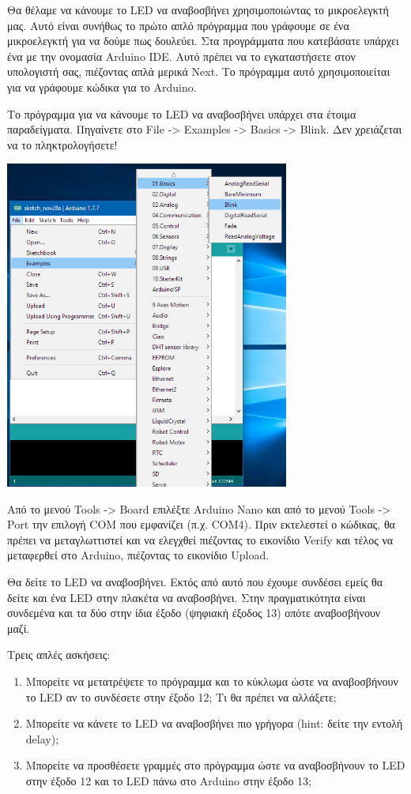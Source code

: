 \documentclass[a4paper,twoside,12pt]{article}
\begin{document}
Θα θέλαμε να κάνουμε το LED να αναβοσβήνει χρησιμοποιώντας το μικροελεγκτή μας. Αυτό είναι συνήθως το πρώτο απλό πρόγραμμα που γράφουμε σε ένα μικροελεγκτή για να δούμε πως δουλεύει. 
Στα προγράμματα που κατεβάσατε υπάρχει ένα με την ονομασία Arduino IDE. Αυτό πρέπει να το εγκαταστήσετε στον υπολογιστή σας, πιέζοντας απλά μερικά Next. Το πρόγραμμα αυτό χρησιμοποιείται για να γράφουμε κώδικα για το Arduino.

Το πρόγραμμα για να κάνουμε το LED να αναβοσβήνει υπάρχει στα έτοιμα παραδείγματα. Πηγαίνετε στο File -> Examples -> Basics -> Blink. Δεν χρειάζεται να το πληκτρολογήσετε!

\begin{center}
  \includegraphics[width=0.7\textwidth]{images/main/blink-program}
\end{center}

Από το μενού Tools -> Board επιλέξτε Arduino Nano και από το μενού Tools -> Port την επιλογή COM που εμφανίζει (π.χ. COM4). Πριν εκτελεστεί ο κώδικας, θα πρέπει να μεταγλωττιστεί και να ελεγχθεί πιέζοντας το εικονίδιο Verify και τέλος να μεταφερθεί στο Arduino, πιέζοντας το εικονίδιο Upload.

Θα δείτε το LED να αναβοσβήνει. Εκτός από αυτό που έχουμε συνδέσει εμείς θα δείτε και ένα LED στην πλακέτα να αναβοσβήνει. Στην πραγματικότητα είναι συνδεμένα και τα δύο στην ίδια έξοδο (ψηφιακή έξοδος 13) οπότε αναβοσβήνουν μαζί.

Τρεις απλές ασκήσεις:
\begin{enumerate}
\item Μπορείτε να μετατρέψετε το πρόγραμμα και το κύκλωμα ώστε να αναβοσβήνουν το LED αν το συνδέσετε στην έξοδο 12; Τι θα πρέπει να αλλάξετε; 
\item Μπορείτε να κάνετε το LED να αναβοσβήνει πιο γρήγορα (hint: δείτε την εντολή delay);
\item Μπορείτε να προσθέσετε γραμμές στο πρόγραμμα ώστε να αναβοσβήνουν το LED στην έξοδο 12 και το LED πάνω στο Arduino στην έξοδο 13;
\end{enumerate}
\end{document}
